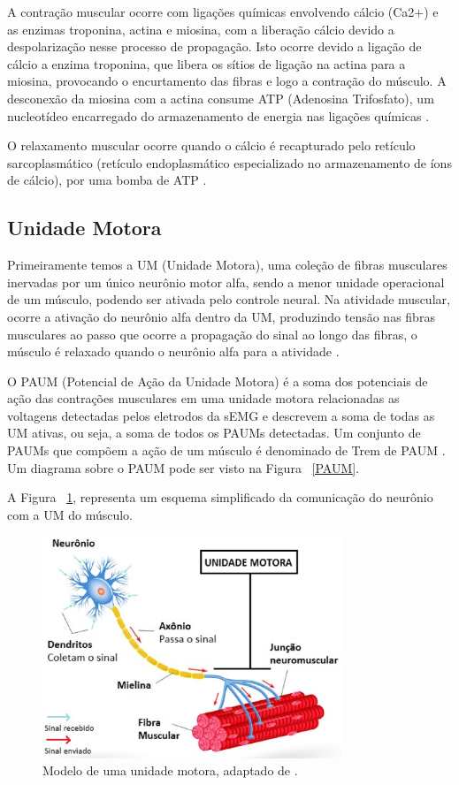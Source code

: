 A contração muscular ocorre com ligações químicas envolvendo cálcio (Ca2+) e as enzimas troponina, actina e miosina, com a liberação cálcio devido a despolarização nesse processo de propagação. Isto ocorre devido a ligação de cálcio a enzima troponina, que libera os sítios de ligação na actina para a miosina, provocando o encurtamento das fibras e logo a contração do músculo. A desconexão da miosina com a actina consume ATP (Adenosina Trifosfato), um nucleotídeo encarregado do armazenamento de energia nas ligações químicas \cite{da2005detecccao}.

O relaxamento muscular ocorre quando o cálcio é recapturado pelo retículo sarcoplasmático (retículo endoplasmático especializado no armazenamento de íons de cálcio), por uma bomba de ATP \cite{da2005detecccao}. 

\subsection{Unidade Motora}
Primeiramente temos a UM (Unidade Motora), uma coleção de fibras musculares inervadas por um único neurônio motor alfa, sendo a menor unidade operacional de um músculo, podendo ser ativada pelo controle neural. Na atividade muscular, ocorre a ativação do neurônio alfa dentro da UM, produzindo tensão nas fibras musculares ao passo que ocorre a propagação do sinal ao longo das fibras, o músculo é relaxado quando o neurônio alfa para a atividade \cite{yousefi2014characterizing}.

O PAUM (Potencial de Ação da Unidade Motora) é a soma dos potenciais de ação das contrações musculares em uma unidade motora relacionadas as voltagens detectadas pelos eletrodos da sEMG e descrevem a soma de todas as UM ativas, ou seja, a soma de todos os PAUMs detectadas. Um conjunto de PAUMs que compõem a ação de um músculo é denominado de Trem de PAUM \cite{yousefi2014characterizing}. Um diagrama sobre o PAUM pode ser visto na Figura ~\ref{PAUM}.

A Figura ~\ref{UnidadeMotora}, representa um esquema simplificado da comunicação do neurônio com a UM do músculo.

\begin{figure}[!htb]
   \centering
    \includegraphics[width=0.8\textwidth]{figuras/motor-neuron.eps}
    \caption{Modelo de uma unidade motora, adaptado de .}
    \label{UnidadeMotora}
\end{figure}


